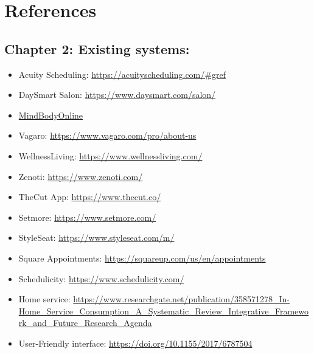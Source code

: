 \documentclass{article}
\begin{document}
      \section{References}
      \subsection{Chapter 2: Existing systems:} 
      \begin{itemize}
        \item Acuity Scheduling: \href{https://acuityscheduling.com/\#gref}{https://acuityscheduling.com/\#gref}
        \item DaySmart Salon: \href{https://www.daysmart.com/salon/}{https://www.daysmart.com/salon/}
        \item \href{ https://www.mindbodyonline.com/en-gb/business/lp/mindbody?landing=y&utm_source=google&utm_medium=ppc&utm_campaign=20430748488&ad_group=160722387588&utm_term=kwd-329860702&utm_device=c&referralSource=paid+search&matchtype=e&cid=685008699808&networkType=search&adgroupid=160722387588&creative=685008699808&network=g&adGroup=160722387588&_bk=mindbody&_bm=e&gad_source=1&gclid=Cj0KCQiArrCvBhCNARIsAOkAGcXkhoxZN2kd43kY-JN37kZmb38xqd5jLQhS4T8uUtLw5eR_OVGaqy4aAlL3EALw_wcB}{MindBodyOnline}
        \item Vagaro: \href{https://www.vagaro.com/pro/about-us}{https://www.vagaro.com/pro/about-us}
        \item WellnessLiving: \href{https://www.wellnessliving.com/}{https://www.wellnessliving.com/}
        \item Zenoti: \href{https://www.zenoti.com/}{https://www.zenoti.com/}
        \item TheCut App: \href{https://www.thecut.co/}{https://www.thecut.co/}
        \item Setmore: \href{https://www.setmore.com/}{https://www.setmore.com/}
        \item StyleSeat: \href{https://www.styleseat.com/m/}{https://www.styleseat.com/m/}
        \item Square Appointments: \href{https://squareup.com/us/en/appointments}{https://squareup.com/us/en/appointments}
        \item Schedulicity: \href{https://www.schedulicity.com/}{https://www.schedulicity.com/}  
        \item Home service: \url{https://www.researchgate.net/publication/358571278_In-Home_Service_Consumption_A_Systematic_Review_Integrative_Framework_and_Future_Research_Agenda}
        \item User-Friendly interface: \href{https://doi.org/10.1155/2017/6787504}{https://doi.org/10.1155/2017/6787504}

\end{itemize}
\end{document}
